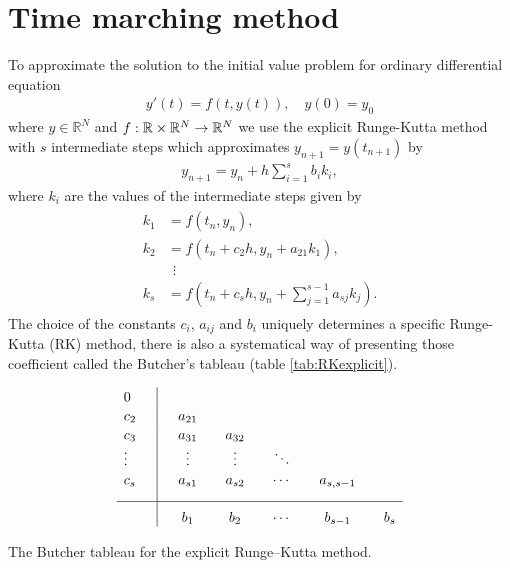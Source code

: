 \section{Time marching method}
\label{sec:time-marching-method}

To approximate the solution to the initial value problem for ordinary
differential equation
\begin{align}
  \label{eq:114}
  y'(t)=f(t,y(t)),\quad y(0)=y_0
\end{align}
where $y\in \mathbb{R}^N$ and
$f:\mathbb{R}\times\mathbb{R}^N\rightarrow\mathbb{R}^N$ we use the explicit
Runge-Kutta method with $s$ intermediate steps which approximates
$y_{n+1}=y(t_{n+1})$ by
\begin{align}
  \label{eq:115}
  y_{n+1}=y_n+h\sum_{i=1}^s b_i k_i,
\end{align}
where $k_i$ are the values of the intermediate steps given by
\begin{align}
  \label{eq:117}
  \begin{split}
    k_1 &= f(t_n,y_n), \\
    k_2 &= f(t_n+c_2 h, y_n+a_{21}k_1), \\
    & \ \ \vdots \\
    k_s &= f(t_n+c_s h, y_n + \sum_{j=1}^{s-1} a_{sj}k_j).
  \end{split}
\end{align}
The choice of the constants $c_i$, $a_{ij}$ and $b_i$ uniquely
determines a specific Runge-Kutta (RK) method, there is also a
systematical way of presenting those coefficient called the Butcher's
tableau (table \ref{tab:RKexplicit}).

\begin{table}[h]
  \begin{equation*}
    \begin{array}{l | c c c c c}
      \rule{0pt}{2,3ex} 0      \quad &             &               &              &         &   \\
      \rule{0pt}{2,3ex} c_2    \quad & \quad a_{21}  &              &              &         &   \\
      \rule{0pt}{2,3ex} c_3    \quad & \quad a_{31}  & \quad a_{32}  &              &         &   \\
      \rule{0pt}{2,3ex} \vdots \quad & \quad \vdots & \quad \vdots & \quad \ddots &         &   \\
      \rule{0pt}{2,3ex} c_s    \quad & \quad a_{s1}  & \quad a_{s2}  & \quad \cdots & \quad a_{s,s-1} & \\[2,0ex] \hline
      \rule{0pt}{3,3ex}              & \quad b_{1}  & \quad b_{2}    & \quad \cdots & \quad b_{s-1}  & \quad b_{s}
    \end{array}
  \end{equation*}
  \caption{The Butcher tableau for the explicit Runge–Kutta method.}
  \label{tab:RKexplicit}
\end{table}

